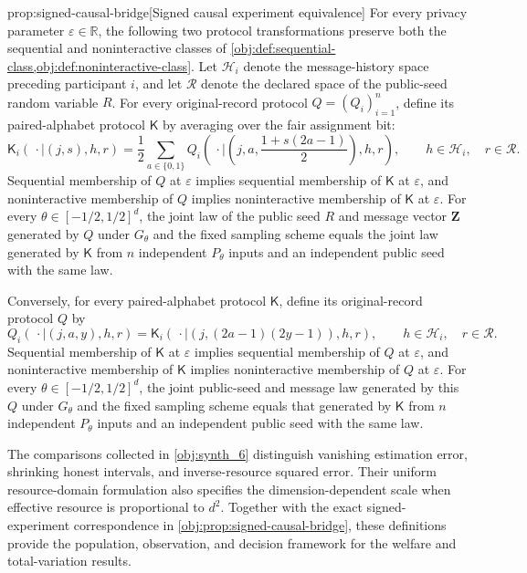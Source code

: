 \documentclass[11pt]{article}
\begin{document}
\begin{propositionv}{prop:signed-causal-bridge}[Signed causal experiment equivalence]
For every privacy parameter \(\varepsilon\in\mathbb R\), the following two protocol transformations preserve both the sequential and noninteractive classes of \cref{obj:def:sequential-class,obj:def:noninteractive-class}. Let \(\mathcal H_i\) denote the message-history space preceding participant \(i\), and let \(\mathcal R\) denote the declared space of the public-seed random variable \(R\). For every original-record protocol \(Q=(Q_i)_{i=1}^n\), define its paired-alphabet protocol \(\mathsf K\) by averaging over the fair assignment bit:
\[
\mathsf K_i(\,\cdot\mid(j,s),h,r)
=
\frac12\sum_{a\in\{0,1\}}
Q_i\!\left(
\,\cdot\mid
\left(j,a,\frac{1+s(2a-1)}2\right),h,r
\right),
\qquad
h\in\mathcal H_i,\quad r\in\mathcal R.
\]
Sequential membership of \(Q\) at \(\varepsilon\) implies sequential membership of \(\mathsf K\) at \(\varepsilon\), and noninteractive membership of \(Q\) implies noninteractive membership of \(\mathsf K\) at \(\varepsilon\). For every \(\theta\in[-1/2,1/2]^d\), the joint law of the public seed \(R\) and message vector \(\mathbf Z\) generated by \(Q\) under \(G_\theta\) and the fixed sampling scheme equals the joint law generated by \(\mathsf K\) from \(n\) independent \(P_\theta\) inputs and an independent public seed with the same law.

Conversely, for every paired-alphabet protocol \(\mathsf K\), define its original-record protocol \(Q\) by
\[
Q_i(\,\cdot\mid(j,a,y),h,r)
=
\mathsf K_i(\,\cdot\mid(j,(2a-1)(2y-1)),h,r),
\qquad
h\in\mathcal H_i,\quad r\in\mathcal R.
\]
Sequential membership of \(\mathsf K\) at \(\varepsilon\) implies sequential membership of \(Q\) at \(\varepsilon\), and noninteractive membership of \(\mathsf K\) implies noninteractive membership of \(Q\) at \(\varepsilon\). For every \(\theta\in[-1/2,1/2]^d\), the joint public-seed and message law generated by this \(Q\) under \(G_\theta\) and the fixed sampling scheme equals that generated by \(\mathsf K\) from \(n\) independent \(P_\theta\) inputs and an independent public seed with the same law.
\end{propositionv}

The comparisons collected in \cref{obj:synth_6} distinguish vanishing estimation error, shrinking honest intervals, and inverse-resource squared error. Their uniform resource-domain formulation also specifies the dimension-dependent scale when effective resource is proportional to \(d^2\). Together with the exact signed-experiment correspondence in \cref{obj:prop:signed-causal-bridge}, these definitions provide the population, observation, and decision framework for the welfare and total-variation results.
\end{document}
